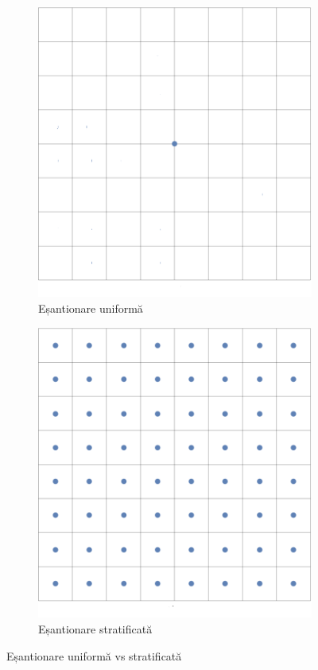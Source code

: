 \documentclass[12pt,a4paper]{report}
\numberwithin{equation}{section} %
\begin{document}
\begin{figure}[ht]
	\centering
	\begin{subfigure}[h]{0.45\linewidth}
		\centering
		\includegraphics[width=\linewidth]{pics/point-samples.png}
		\caption{Eșantionare uniformă}
	\end{subfigure}
	\hfill
	\begin{subfigure}[h]{0.45\linewidth}
		\centering
		\includegraphics[width=\linewidth]{pics/uniform-point-samples.png}
		\caption{Eșantionare stratificată}
	\end{subfigure}
	\caption{Eșantionare uniformă vs stratificată\protect\footnotemark}
	\label{fig:uniform_sampling}
\end{figure}
\end{document}
